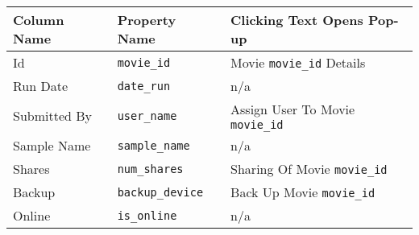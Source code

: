 \begin{tabular}{lll}
\toprule
 Column Name   & Property Name   & Clicking Text Opens Pop-up    \\
\midrule
 Id            & \texttt{movie\_id}        & Movie \texttt{movie\_id} Details        \\
 Run Date      & \texttt{date\_run}        & n/a                           \\
 Submitted By  & \texttt{user\_name}       & Assign User To Movie \texttt{movie\_id} \\
 Sample Name   & \texttt{sample\_name}     & n/a                           \\
 Shares        & \texttt{num\_shares}      & Sharing Of Movie \texttt{movie\_id}     \\
 Backup        & \texttt{backup\_device}   & Back Up Movie \texttt{movie\_id}        \\
 Online        & \texttt{is\_online}       & n/a                           \\
\bottomrule
\end{tabular}